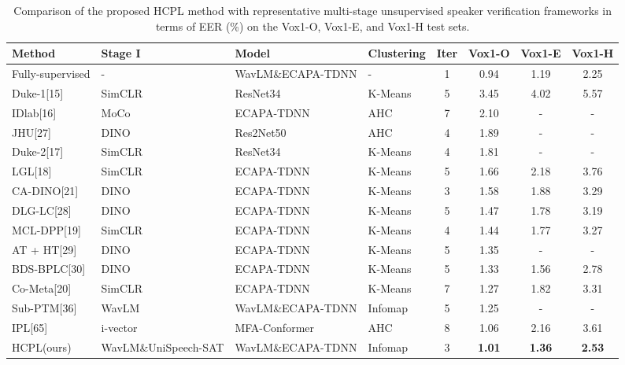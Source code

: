 \documentclass[lettersize,journal]{IEEEtran}
\begin{document}
\begin{table}[t] %
    \centering
    \caption{Comparison of the proposed HCPL method with representative multi-stage unsupervised speaker verification frameworks in terms of EER (\%) on the Vox1-O, Vox1-E, and Vox1-H test sets.} %
    \setlength{\tabcolsep}{10pt} %
    \begin{tabular}{l l l l c c c c} %
        \hline
        Method & Stage I & Model & Clustering & Iter & Vox1-O & Vox1-E & Vox1-H  \\
        \hline
        Fully-supervised & - & WavLM\&ECAPA-TDNN& -&1   & 0.94 & 1.19 & 2.25   \\  
        \hline
        Duke-1[15] & SimCLR &ResNet34 &K-Means& 5   & 3.45 & 4.02 & 5.57\\ 
        IDlab[16] & MoCo&ECAPA-TDNN &AHC & 7   & 2.10 & - & -   \\ 
        JHU[27] & DINO&Res2Net50 &AHC & 4   & 1.89 & - & -   \\ 
        Duke-2[17] &SimCLR& ResNet34& K-Means &4   & 1.81 & - & -   \\ 
        LGL[18]  & SimCLR&ECAPA-TDNN &K-Means& 5   & 1.66 & 2.18 & 3.76   \\ 
        CA-DINO[21] & DINO &ECAPA-TDNN&K-Means& 3   & 1.58 & 1.88 & 3.29   \\ 
        DLG-LC[28]  & DINO &ECAPA-TDNN &K-Means& 5   & 1.47 & 1.78 & 3.19   \\ 
        MCL-DPP[19]& SimCLR &ECAPA-TDNN &K-Means& 4   & 1.44 & 1.77 & 3.27   \\ 
        AT + HT[29]  & DINO &ECAPA-TDNN &K-Means& 5   & 1.35 & - & -   \\ 
        BDS-BPLC[30] & DINO &ECAPA-TDNN&K-Means& 5   & 1.33 & 1.56 & 2.78   \\ 

        Co-Meta[20] & SimCLR &ECAPA-TDNN&K-Means& 7   & 1.27 & 1.82 & 3.31   \\ 
        Sub-PTM[36] & WavLM & WavLM\&ECAPA-TDNN&Infomap & 5   & 1.25 & - & -   \\ 
        IPL[65] &i-vector &MFA-Conformer&  AHC &8   & 1.06 & 2.16 & 3.61   \\ 
        HCPL(ours) &WavLM\&UniSpeech-SAT & WavLM\&ECAPA-TDNN&Infomap& 3   & \textbf{1.01} & \textbf{1.36} & \textbf{2.53}   \\
        \hline
    \end{tabular}
    \label{tab:multi-stage comparison}
\end{table}
\FloatBarrier
\end{document}
